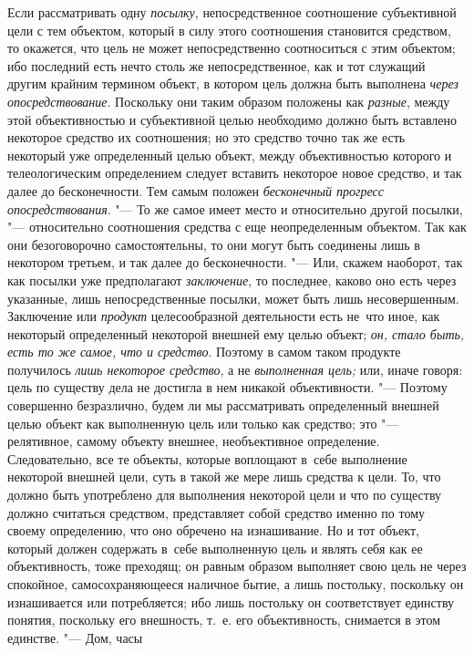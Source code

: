 Если рассматривать одну
{\em посылку},
непосредственное соотношение субъективной цели с тем
объектом, который в силу этого соотношения становится средством, то
окажется, что цель не может непосредственно соотноситься с этим объектом;
ибо последний есть нечто столь же непосредственное, как и тот служащий
другим крайним термином объект, в котором цель должна быть выполнена
{\em через опосредствование}.
Поскольку они таким образом положены как
{\em разные}, между этой
объективностью и субъективной целью необходимо должно быть вставлено
некоторое средство их соотношения; но это средство точно так же есть
некоторый уже определенный целью объект, между объективностью которого и
телеологическим определением следует вставить некоторое новое средство, и
так далее до бесконечности. Тем самым положен
{\em бесконечный прогресс}
{\em опосредствования}. "---
То же самое имеет место и относительно другой
посылки, "--- относительно соотношения средства с еще
неопределенным объектом. Так как они безоговорочно самостоятельны, то они
могут быть соединены лишь в некотором третьем, и так далее до
бесконечности. "--- Или, скажем наоборот, так как посылки уже
предполагают {\em заключение},
то последнее, каково оно есть через указанные, лишь
непосредственные посылки, может быть лишь несовершенным. Заключение или
{\em продукт} целесообразной деятельности есть не~что иное, как некоторый
определенный некоторой внешней ему целью объект;
{\em он, стало быть, есть то же самое,
что и средство}. Поэтому в самом таком продукте получилось
{\em лишь некоторое средство}, а не {\em выполненная
цель;} или, иначе говоря: цель по существу дела не достигла
в нем никакой объективности. "--- Поэтому совершенно
безразлично, будем ли мы рассматривать определенный внешней целью объект
как выполненную цель или только как средство; это
"--- релятивное, самому объекту внешнее, необъективное
определение. Следовательно, все те объекты, которые воплощают в~себе
выполнение некоторой внешней цели, суть в такой же мере лишь средства к
цели. То, что должно быть употреблено для выполнения некоторой цели и что
по существу должно считаться средством, представляет собой средство именно
по тому своему определению, что оно обречено на изнашивание. Но и тот
объект, который должен содержать в~себе выполненную цель и являть себя как
ее объективность, тоже преходящ; он равным образом выполняет свою цель не
через спокойное, самосохраняющееся наличное бытие, а лишь постольку,
поскольку он изнашивается или потребляется; ибо лишь постольку он
соответствует единству понятия, поскольку его внешность, т.~е. его
объективность, снимается в этом единстве. "--- Дом, часы
